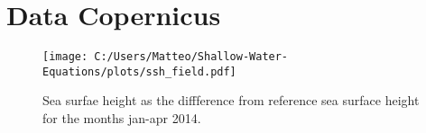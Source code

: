 \section{Data Copernicus}

\begin{figure}[H]
    \centering
    \texttt{[image: C:/Users/Matteo/Shallow-Water-Equations/plots/ssh\_field.pdf]}
    \caption{Sea surfae height as the diffference from reference sea surface height for the months jan-apr 2014.}\label{fig:copernices-ssh}
\end{figure}


